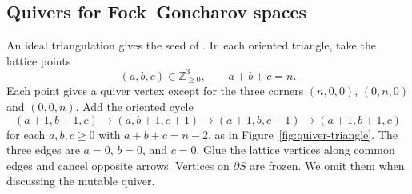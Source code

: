 \documentclass[12pt, letter]{amsart}
\theoremstyle{definition}
\newcommand{\Z}{\mathbb Z}
\numberwithin{equation}{section}
\begin{document}
\subsection{Quivers for Fock--Goncharov spaces}
An ideal triangulation gives the seed of
\cite[Definition~1.11 and Section~9]{FG}. In each oriented triangle,
take the lattice points
\[
 (a,b,c)\in\Z_{\ge0}^3,\qquad a+b+c=n.
\]
Each point gives a quiver vertex except for the three corners
$(n,0,0)$, $(0,n,0)$ and $(0,0,n)$. Add the oriented cycle
\begin{equation}\label{eq:small-triangle}
 (a+1,b+1,c)\longrightarrow(a,b+1,c+1)
 \longrightarrow(a+1,b,c+1)\longrightarrow(a+1,b+1,c)
\end{equation}
for each $a,b,c\ge0$ with $a+b+c=n-2$, as in Figure~\ref{fig:quiver-triangle}.
The three edges are $a=0$, $b=0$, and $c=0$.
Glue the lattice vertices along common edges and cancel opposite
arrows. Vertices on $\partial S$ are frozen. We omit them
when discussing the mutable quiver.
\end{document}
